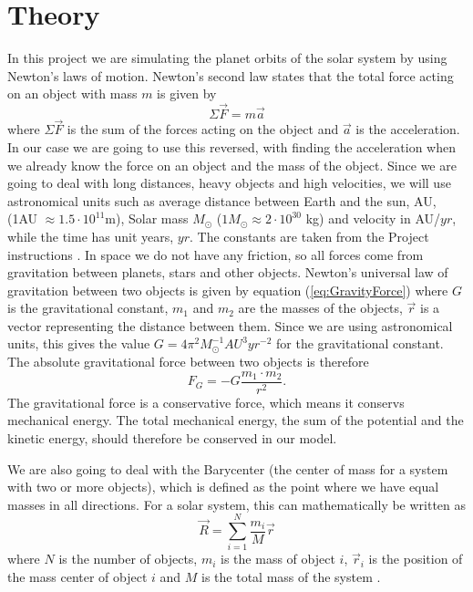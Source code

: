 \documentclass[norsk,a4paper,12pt]{article}
\begin{document}
\section{Theory}
In this project we are simulating the planet orbits of the solar system by using Newton's laws of motion. Newton's second law states that the total force acting on an object with mass $m$ is given by
\begin{equation}
\Sigma\vec{F}=m\vec{a}
\label{eq:N2L}
\end{equation}
where $\Sigma \vec{F}$ is the sum of the forces acting on the object and $\vec{a}$ is the acceleration. In our case we are going to use this reversed, with finding the acceleration when we already know the force on an object and the mass of the object. Since we are going to deal with long distances, heavy objects and high velocities, we will use astronomical units such as average distance between Earth and the sun, AU, (1AU $\approx1.5\cdot10^{11}$m), Solar mass $M_\odot$ ($1M_{\odot}\approx2\cdot10^{30}$ kg) and velocity in AU/$yr$, while the time has unit years, $yr$. The constants are taken from the Project instructions \cite {Project_text}. In space we do not have any friction, so all forces come from gravitation between planets, stars and other objects. Newton's universal law of gravitation between two objects is given by equation (\ref{eq:GravityForce})
where $G$ is the gravitational constant, $m_1$ and $m_2$ are the masses of the objects, $\vec{r}$ is a vector representing the distance between them. Since we are using astronomical units, this gives the value $G = 4\pi^2 M_{\odot} ^{-1} AU^3 yr^{-2}$ \cite{Project_text} for the gravitational constant.  The absolute gravitational force between two objects is therefore
\begin{equation}
F_G=-G\frac{m_1\cdot m_2}{r^2}.
\label{eq:absGravitationalForce}
\end{equation}
The gravitational force is a conservative force, which means it conservs mechanical energy\cite{Concervative_Force}. The total mechanical energy, the sum of the potential and the kinetic energy, should therefore be conserved in our model.

We are also going to deal with the Barycenter (the center of mass for a system with two or more objects), which is defined as the point where we have equal masses in all directions. For a solar system, this can mathematically be written as
\begin{equation}
\vec{R}=\sum_{i=1}^N \frac{m_i}{M}\vec{r}
\end{equation}
where $N$ is the number of objects, $m_i$ is the mass of object $i$, $\vec{r}_i$ is the position of the mass center of object $i$ and $M$ is the total mass of the system \cite{Barycenter}.\par\vspace{5mm}
\end{document}
